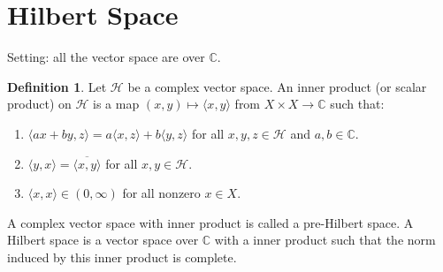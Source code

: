 \documentclass[12pt,a4paper]{book}
\newcommand{\bb}[1]{\mathbb{#1}}
\newenvironment{enu}{\begin{enumerate}[(1)]}{\end{enumerate}}
\theoremstyle{definition}
\newtheorem{defn}{Definition}[section]
\begin{document}
\section{Hilbert Space}
Setting: all the vector space are over $\bb{C}$.


\begin{defn}
    Let $\mathcal{H}$ be a complex vector space. An inner product (or scalar product) on $\mathcal{H}$ is a map $(x, y) \mapsto\langle x, y\rangle$ from $X \times X \rightarrow \mathbb{C}$ such that:
\begin{enu} 
    \item $\langle a x+b y, z\rangle=a\langle x, z\rangle+b\langle y, z\rangle$ for all $x, y, z \in \mathcal{H}$ and $a, b \in \mathbb{C}$.
    \item $\langle y, x\rangle=\overline{\langle x, y\rangle}$ for all $x, y \in \mathcal{H}$.
    \item $\langle x, x\rangle \in(0, \infty)$ for all nonzero $x \in X$.
\end{enu}
A complex vector space with inner product is called a pre-Hilbert space.
A Hilbert space is a vector space over $\bb{C}$ with a inner product such that the norm induced by this inner product is complete.
\end{defn}
\end{document}
